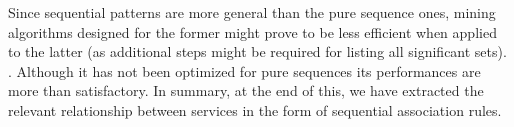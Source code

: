 Since sequential patterns are more general than the pure sequence ones, mining algorithms designed for the former might prove to be less efficient when applied to the latter (as additional steps might be required for listing all significant sets).
 . Although it has not been optimized for pure sequences its performances are more than satisfactory. In summary, at the end of this, we have extracted the  relevant relationship between services in the form of sequential association rules.